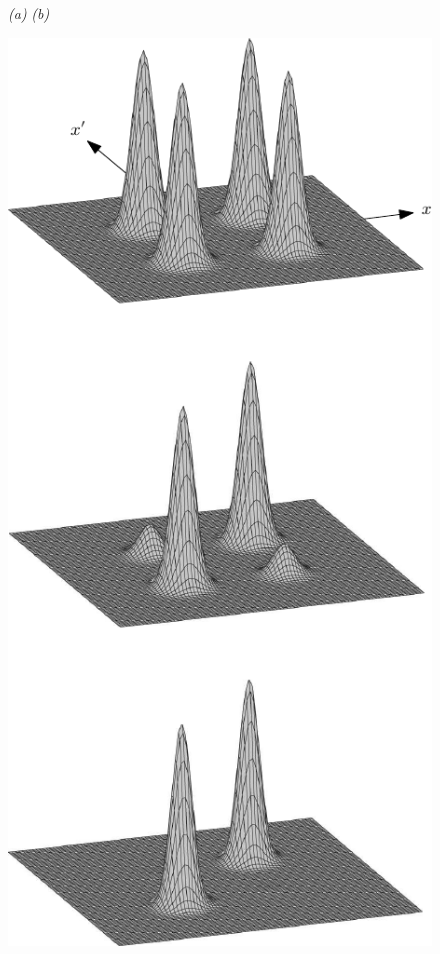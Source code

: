 \documentclass[3p,sort&compress,12pt]{elsarticle}
\begin{document}
\begin{figure}
{\footnotesize \hspace{1.1cm} \emph{(a)} \hspace{6.9cm} \emph{(b)}}

\centering
\includegraphics[scale=.77]{r1.pdf} \hspace{1.5cm}

\end{figure}
\end{document}
